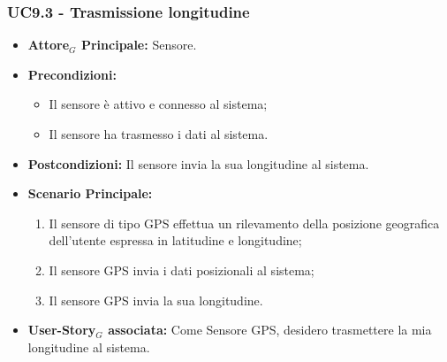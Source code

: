 \documentclass[11pt]{article}
\begin{document}
\begin{justify}
\subsubsection{\textbf{UC9.3 - Trasmissione longitudine}}
\begin{itemize}
    \item \textbf{Attore$_G$ Principale:} Sensore.
    \item \textbf{Precondizioni:} 
        \begin{itemize}
    	\item Il sensore è attivo e connesso al sistema;
          \item Il sensore ha trasmesso i dati al sistema.
        \end{itemize}
    \item \textbf{Postcondizioni:} Il sensore invia la sua longitudine al sistema.
    \item \textbf{Scenario Principale:} 
        \begin{enumerate}
            \item Il sensore di tipo GPS effettua un rilevamento della posizione geografica dell'utente espressa in latitudine e longitudine;
            \item Il sensore GPS invia i dati posizionali al sistema;
            \item Il sensore GPS invia la sua longitudine.
        \end{enumerate}
    \item \textbf{User-Story$_G$ associata:} Come Sensore GPS, desidero trasmettere la mia longitudine al sistema.
\end{itemize}



\end{justify}
\end{document}
